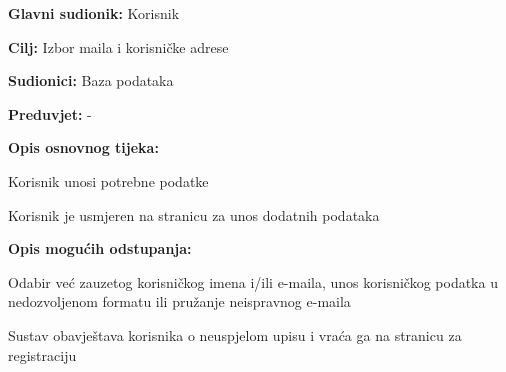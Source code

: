 					\noindent {}
					\begin{packed_item}
	
						\item \textbf{Glavni sudionik:} Korisnik
						\item  \textbf{Cilj:} Izbor maila i korisničke adrese
						\item  \textbf{Sudionici:} Baza podataka
						\item  \textbf{Preduvjet:} -
						\item  \textbf{Opis osnovnog tijeka:}
						
						\item[] \begin{packed_enum}
	
							\item Korisnik unosi potrebne podatke
							\item Korisnik je usmjeren na stranicu za unos dodatnih podataka
							
						\end{packed_enum}
						
						\item  \textbf{Opis mogućih odstupanja:}
						
						\item[] \begin{packed_item}
	
							\item[1.a] Odabir već zauzetog korisničkog imena i/ili e-maila, unos korisničkog podatka u nedozvoljenom formatu ili pružanje neispravnog e-maila
							\item[] \begin{packed_enum}
								
								\item Sustav obavještava korisnika o neuspjelom upisu i vraća ga na stranicu za registraciju
								
							\end{packed_enum}
							
						\end{packed_item}
					\end{packed_item}
				

